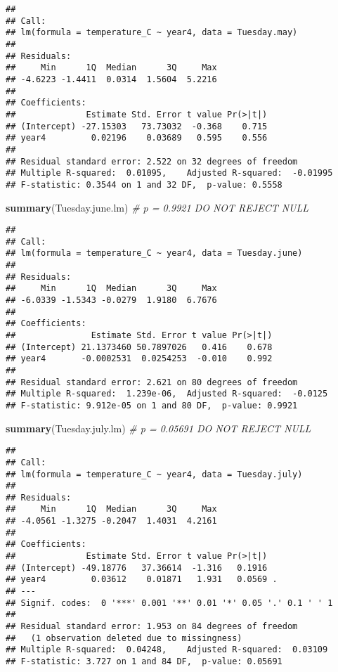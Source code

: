 \documentclass[]{article}
\newenvironment{Shaded}{\begin{snugshade}}{\end{snugshade}}
\newcommand{\CommentTok}[1]{\textcolor[rgb]{0.56,0.35,0.01}{\textit{#1}}}
\newcommand{\KeywordTok}[1]{\textcolor[rgb]{0.13,0.29,0.53}{\textbf{#1}}}
\newcommand{\NormalTok}[1]{#1}
\begin{document}
\begin{verbatim}
## 
## Call:
## lm(formula = temperature_C ~ year4, data = Tuesday.may)
## 
## Residuals:
##     Min      1Q  Median      3Q     Max 
## -4.6223 -1.4411  0.0314  1.5604  5.2216 
## 
## Coefficients:
##              Estimate Std. Error t value Pr(>|t|)
## (Intercept) -27.15303   73.73032  -0.368    0.715
## year4         0.02196    0.03689   0.595    0.556
## 
## Residual standard error: 2.522 on 32 degrees of freedom
## Multiple R-squared:  0.01095,    Adjusted R-squared:  -0.01995 
## F-statistic: 0.3544 on 1 and 32 DF,  p-value: 0.5558
\end{verbatim}

\begin{Shaded}
\begin{Highlighting}[]
\KeywordTok{summary}\NormalTok{(Tuesday.june.lm) }\CommentTok{# p = 0.9921 DO NOT REJECT NULL}
\end{Highlighting}
\end{Shaded}

\begin{verbatim}
## 
## Call:
## lm(formula = temperature_C ~ year4, data = Tuesday.june)
## 
## Residuals:
##     Min      1Q  Median      3Q     Max 
## -6.0339 -1.5343 -0.0279  1.9180  6.7676 
## 
## Coefficients:
##               Estimate Std. Error t value Pr(>|t|)
## (Intercept) 21.1373460 50.7897026   0.416    0.678
## year4       -0.0002531  0.0254253  -0.010    0.992
## 
## Residual standard error: 2.621 on 80 degrees of freedom
## Multiple R-squared:  1.239e-06,  Adjusted R-squared:  -0.0125 
## F-statistic: 9.912e-05 on 1 and 80 DF,  p-value: 0.9921
\end{verbatim}

\begin{Shaded}
\begin{Highlighting}[]
\KeywordTok{summary}\NormalTok{(Tuesday.july.lm) }\CommentTok{# p = 0.05691 DO NOT REJECT NULL}
\end{Highlighting}
\end{Shaded}

\begin{verbatim}
## 
## Call:
## lm(formula = temperature_C ~ year4, data = Tuesday.july)
## 
## Residuals:
##     Min      1Q  Median      3Q     Max 
## -4.0561 -1.3275 -0.2047  1.4031  4.2161 
## 
## Coefficients:
##              Estimate Std. Error t value Pr(>|t|)  
## (Intercept) -49.18776   37.36614  -1.316   0.1916  
## year4         0.03612    0.01871   1.931   0.0569 .
## ---
## Signif. codes:  0 '***' 0.001 '**' 0.01 '*' 0.05 '.' 0.1 ' ' 1
## 
## Residual standard error: 1.953 on 84 degrees of freedom
##   (1 observation deleted due to missingness)
## Multiple R-squared:  0.04248,    Adjusted R-squared:  0.03109 
## F-statistic: 3.727 on 1 and 84 DF,  p-value: 0.05691
\end{verbatim}
\end{document}
